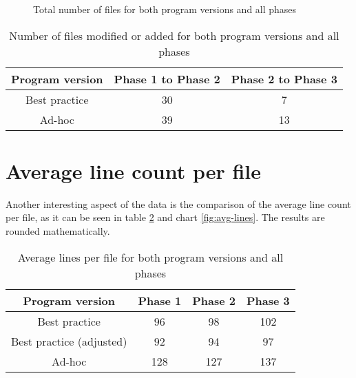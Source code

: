 \begin{figure}
	\centering
	\label{fig:files}
	\caption{Total number of files for both program versions and all phases}
\end{figure}

 \begin{table}
 	\centering
 	\label{table:touched-files}
 	\begin{tabular}{|c|c|c|} \hline
 		\textbf{Program version} &\textbf{Phase 1 to Phase 2} & \textbf{Phase 2 to Phase 3} \\ \hline
 		Best practice & 30 & 7 \\ \hline
 		Ad-hoc & 39 & 13\\ \hline
 	\end{tabular}
 	\caption{Number of files modified or added for both program versions and all phases}
 \end{table}

\section{Average line count per file}
\label{sec:avg-line-count}
Another interesting aspect of the data is the comparison of the average line count per file, as it can be seen in table \ref{table:avg-lines} and chart \ref{fig:avg-lines}. The results are rounded mathematically.

\begin{table}
	\centering
	\label{table:avg-lines}
	\begin{tabular}{|c|c|c|c|} \hline
		\textbf{Program version} &\textbf{Phase 1} & \textbf{Phase 2} & \textbf{Phase 3} \\ \hline
		Best practice & 96 & 98 & 102 \\ \hline
		Best practice (adjusted) & 92 & 94 & 97\\ \hline
		Ad-hoc & 128 & 127 & 137 \\ \hline
	\end{tabular}
	\caption{Average lines per file for both program versions and all phases}
\end{table}

